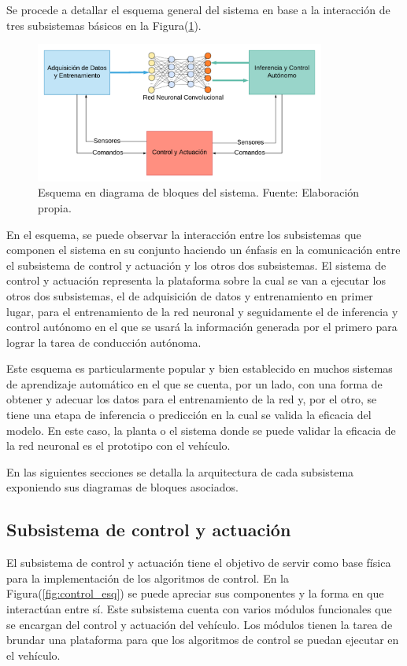     Se procede a detallar el esquema general del sistema en base a la interacción de tres subsistemas básicos en la Figura(\ref{fig:arquitectura}). 

    \begin{figure}[!h] 
        \centering
        \includegraphics[width=0.85\textwidth]{img/arquitectura}
        \caption[Esquema en diagrama de bloques del sistema]{Esquema en diagrama de bloques del sistema. Fuente: Elaboración propia. }
        \label{fig:arquitectura}
    \end{figure}

    En el esquema, se puede observar la interacción entre los subsistemas que componen el sistema en su conjunto haciendo 
    un énfasis en la comunicación entre el subsistema de control y actuación y los otros dos subsistemas. El sistema de 
    control y actuación representa la plataforma sobre la cual se van a ejecutar los otros dos subsistemas, el de adquisición 
    de datos y entrenamiento en primer lugar, para el entrenamiento de la red neuronal y seguidamente el de inferencia 
    y control autónomo en el que se usará la información generada por el primero para lograr la tarea de conducción autónoma. 
    
    Este esquema es particularmente popular y bien establecido en muchos sistemas de aprendizaje automático en el que se cuenta,
    por un lado, con una forma de obtener y adecuar los datos para el entrenamiento de la red y, por el otro, se tiene una 
    etapa de inferencia o predicción en la cual se valida la eficacia del modelo. En este caso, la planta o el sistema donde 
    se puede validar la eficacia de la red neuronal es el prototipo con el vehículo.

    En las siguientes secciones se detalla la arquitectura de cada subsistema exponiendo sus diagramas de bloques asociados.

    \subsection{Subsistema de control y actuación} \label{sec:esqcontrol}
    El subsistema de control y actuación tiene el objetivo de servir como base física para la implementación de los algoritmos 
    de control. En la Figura(\ref{fig:control_esq}) se puede apreciar sus componentes y la forma en que interactúan entre sí. 
    Este subsistema cuenta con varios módulos funcionales que se encargan del control y actuación del vehículo. Los módulos 
    tienen la tarea de brundar una plataforma para que los algoritmos de control se puedan ejecutar en el vehículo. 

